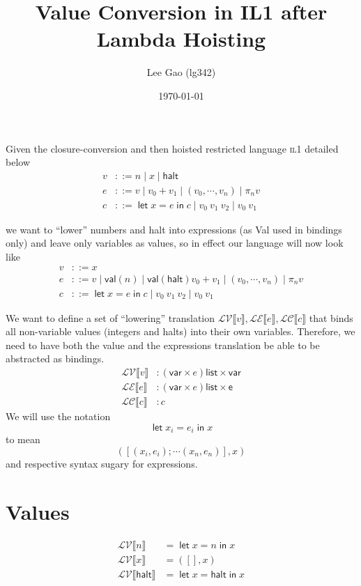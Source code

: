 \documentclass[11pt,a4paper]{article}
\author{Lee Gao (lg342)}
\title{Value Conversion in IL1 after Lambda Hoisting}
\date{\today}
\newcommand {\coo} [1] {\ensuremath{\operatorname{\mathsf{#1}}}}
\newcommand{\Let}[1]{\coo{let} #1 \coo{in} }
\newcommand{\f}[1]{\textsc{#1}}
\newcommand{\g}[1]{\textsf{#1}}
\newcommand{\trans}[2]{\ensuremath{\mathcal{#1}\llbracket #2\rrbracket}}
\begin{document}
\maketitle
\setlength{\parindent}{0pt}

Given the closure-conversion and then hoisted restricted language \f{il1} detailed below
\begin{align*}
v &::= n \mid x \mid \g{halt} \\
e &::= v \mid v_0 + v_1 \mid (v_0,\cdots, v_n) \mid \pi_n v \\
c &::= \Let{x = e}{c} \mid v_0~v_1~v_2 \mid v_0 ~ v_1
\end{align*}

we want to ``lower'' numbers and halt into expressions (as Val used in bindings only) and leave only variables as values, so in effect our language will now look like
\begin{align*}
v &::= x \\
e &::= v \mid \g{val}(n) \mid \g{val}(\g{halt}) v_0 + v_1 \mid (v_0,\cdots, v_n) \mid \pi_n v \\
c &::= \Let{x = e}{c} \mid v_0~v_1~v_2 \mid v_0 ~ v_1
\end{align*}

We want to define a set of ``lowering'' translation $\trans{LV}{v}, \trans{LE}{e}, \trans{LC}{c}$ that binds all non-variable values (integers and halts) into their own variables. Therefore, we need to have both the value and the expressions translation be able to be abstracted as bindings.
\begin{align*}
\trans{LV}{v} &: (\g{var} \times e) \g{list} \times \g{var} \\
\trans{LE}{e} &: (\g{var} \times e) \g{list} \times \g{e} \\
\trans{LC}{c} &: c
\end{align*}
We will use the notation
$$
\Let{x_i = e_i}{x}
$$
to mean
$$
([(x_i,e_i); \cdots (x_n,e_n)],x)
$$
and respective syntax sugary for expressions.

\section{Values}
\begin{align*}
\trans{LV}{n} &= \Let{x = n}{x} \\
\trans{LV}{x} &= ([], x) \\
\trans{LV}{\g{halt}} &= \Let{x = \g{halt}}{x}
\end{align*}
\end{document}
